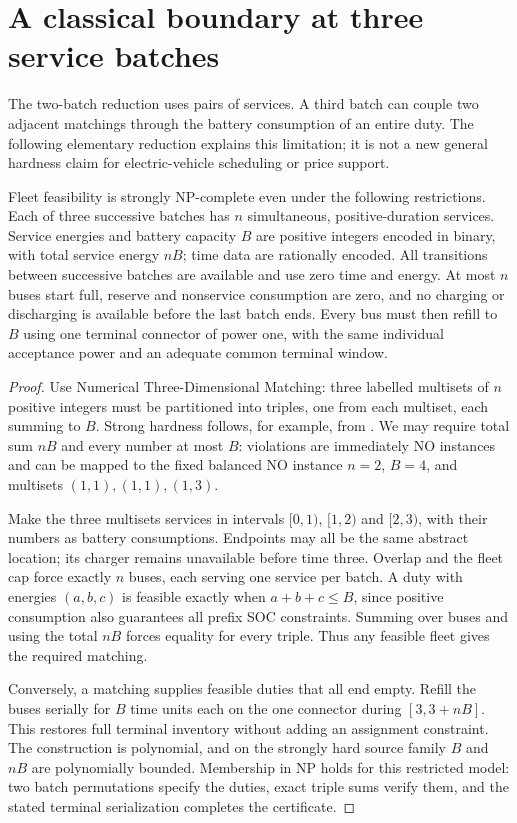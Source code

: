 \section{A classical boundary at three service batches}\label{app:threebatch}
The two-batch reduction uses pairs of services. A third batch can couple
two adjacent matchings through the battery consumption of an entire duty.
The following elementary reduction explains this limitation; it is not a
new general hardness claim for electric-vehicle scheduling or price support.

\begin{proposition}\label{prop:threebatch}
Fleet feasibility is strongly NP-complete even under the following restrictions.
Each of three successive batches has $n$ simultaneous, positive-duration
services. Service energies and battery capacity $B$ are positive integers
encoded in binary, with total service energy $nB$; time data are rationally
encoded. All transitions between
successive batches are available and use zero time and energy. At most $n$
buses start full, reserve and nonservice consumption are zero, and no charging
or discharging is available before the last batch ends. Every bus must then
refill to $B$ using one terminal connector of power one, with the same
individual acceptance power and an adequate common terminal window.
\end{proposition}

\begin{proof}
Use Numerical Three-Dimensional Matching: three labelled multisets of $n$
positive integers must be partitioned into triples, one from each multiset,
each summing to $B$. Strong hardness follows, for example, from
\citet[Section 2, Theorem 2.4]{bosboom2019paths}. We may require total sum $nB$
and every number at most $B$: violations are immediately NO instances and
can be mapped to the fixed balanced NO instance
$n=2$, $B=4$, and multisets $(1,1),(1,1),(1,3)$.

Make the three multisets services in intervals $[0,1)$, $[1,2)$ and $[2,3)$,
with their numbers as battery consumptions. Endpoints may all be the same
abstract location; its charger remains unavailable before time three.
Overlap and the fleet cap force exactly $n$ buses, each serving one service
per batch. A duty with energies $(a,b,c)$ is feasible exactly when
$a+b+c\le B$, since positive consumption also guarantees all prefix SOC
constraints. Summing over buses and using the total $nB$ forces equality
for every triple. Thus any feasible fleet gives the required matching.

Conversely, a matching supplies feasible duties that all end empty. Refill
the buses serially for $B$ time units each on the one connector during
$[3,3+nB]$. This restores full terminal inventory without adding an assignment
constraint. The construction is polynomial, and on the strongly hard source
family $B$ and $nB$ are polynomially bounded. Membership in NP holds for
this restricted model: two batch permutations specify the duties, exact
triple sums verify them, and the stated terminal serialization completes
the certificate.
\end{proof}

